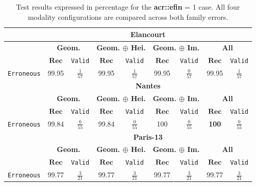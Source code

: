         \begin{table}
            \footnotesize
            \renewcommand{\arraystretch}{1.5}
            \begin{tabular}{|c | c c | c c | c c | c c |}
                \hline
                & \multicolumn{8}{c|}{\textbf{Elancourt}}\\
                \hline
                &\multicolumn{2}{c|}{\textbf{Geom.}} & \multicolumn{2}{c|}{\textbf{Geom. \(\oplus\) Hei.}} & \multicolumn{2}{c|}{\textbf{Geom. \(\oplus\) Im.}} & \multicolumn{2}{x{2.4cm}|}{\textbf{All}}\\
                \cline{2-9}
                & \(\bm{Rec}\) & \texttt{Valid} &  \(\bm{Rec}\) & \texttt{Valid} &  \(\bm{Rec}\) & \texttt{Valid} &  \(\bm{Rec}\) & \texttt{Valid} \\
                \hline
                \texttt{Erroneous} & 99.95 & $\frac{1}{57}$ & 99.95 & $\frac{1}{57}$ & 99.95 & $\frac{0}{57}$ & 99.95 & $\frac{1}{57}$ \\
                \hline
                \hline
                & \multicolumn{8}{c|}{\textbf{Nantes}}\\
                \hline
                &\multicolumn{2}{c|}{\textbf{Geom.}} & \multicolumn{2}{c|}{\textbf{Geom. \(\oplus\) Hei.}} & \multicolumn{2}{c|}{\textbf{Geom. \(\oplus\) Im.}} & \multicolumn{2}{x{2.4cm}|}{\textbf{All}}\\
                \cline{2-9}
                & \(\bm{Rec}\) & \texttt{Valid} &  \(\bm{Rec}\) & \texttt{Valid} &  \(\bm{Rec}\) & \texttt{Valid} &  \(\bm{Rec}\) & \texttt{Valid} \\
                \hline
                \texttt{Erroneous} & 99.84 & $\frac{0}{55}$ & 99.84 & $\frac{0}{55}$ & 100 & $\frac{0}{55}$ & \textbf{100} & $\frac{0}{55}$ \\
                \hline
                \hline
                & \multicolumn{8}{c|}{\textbf{Paris-13}}\\
                \hline
                &\multicolumn{2}{c|}{\textbf{Geom.}} & \multicolumn{2}{c|}{\textbf{Geom. \(\oplus\) Hei.}} & \multicolumn{2}{c|}{\textbf{Geom. \(\oplus\) Im.}} & \multicolumn{2}{x{2.4cm}|}{\textbf{All}}\\
                \cline{2-9}
                & \(\bm{Rec}\) & \texttt{Valid} &  \(\bm{Rec}\) & \texttt{Valid} &  \(\bm{Rec}\) & \texttt{Valid} &  \(\bm{Rec}\) & \texttt{Valid} \\
                \hline
                \texttt{Erroneous} & 99.77 & $\frac{3}{21}$ & 99.77 & $\frac{3}{21}$ & 99.77 & $\frac{3}{21}$ & 99.77 & $\frac{3}{21}$ \\
                \hline
            \end{tabular}
            \renewcommand{\arraystretch}{1}
            \caption{
                \label{tab::ablation_f1}
                Test results expressed in percentage for the \textbf{\gls{acr::efin}} = 1 case.
                All four modality configurations are compared across both family errors.
            }
        \end{table}
        
